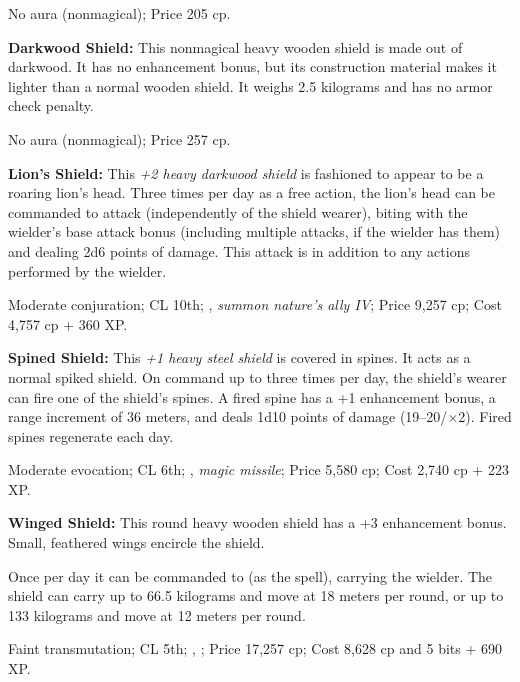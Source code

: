 No aura (nonmagical); Price 205 cp.


\textbf{Darkwood Shield:} This nonmagical heavy wooden shield is made out of darkwood. It has no enhancement bonus, but its construction material makes it lighter than a normal wooden shield. It weighs 2.5 kilograms and has no armor check penalty.

No aura (nonmagical); Price 257 cp.


\textbf{Lion's Shield:} This \emph{+2 heavy darkwood shield} is fashioned to appear to be a roaring lion's head. Three times per day as a free action, the lion's head can be commanded to attack (independently of the shield wearer), biting with the wielder's base attack bonus (including multiple attacks, if the wielder has them) and dealing 2d6 points of damage. This attack is in addition to any actions performed by the wielder.

Moderate conjuration; CL 10th; , \emph{summon nature's ally IV}; Price 9,257 cp; Cost 4,757 cp + 360 XP.


\textbf{Spined Shield:} This \emph{+1 heavy steel shield} is covered in spines. It acts as a normal spiked shield. On command up to three times per day, the shield's wearer can fire one of the shield's spines. A fired spine has a +1 enhancement bonus, a range increment of 36 meters, and deals 1d10 points of damage (19--20/$\times$2). Fired spines regenerate each day.

Moderate evocation; CL 6th; , \emph{magic missile}; Price 5,580 cp; Cost 2,740 cp + 223 XP.


\textbf{Winged Shield:} This round heavy wooden shield has a +3 enhancement bonus. Small, feathered wings encircle the shield.

Once per day it can be commanded to  (as the spell), carrying the wielder. The shield can carry up to 66.5 kilograms and move at 18 meters per round, or up to 133 kilograms and move at 12 meters per round.

Faint transmutation; CL 5th; , ; Price 17,257 cp; Cost 8,628 cp and 5 bits + 690 XP.
